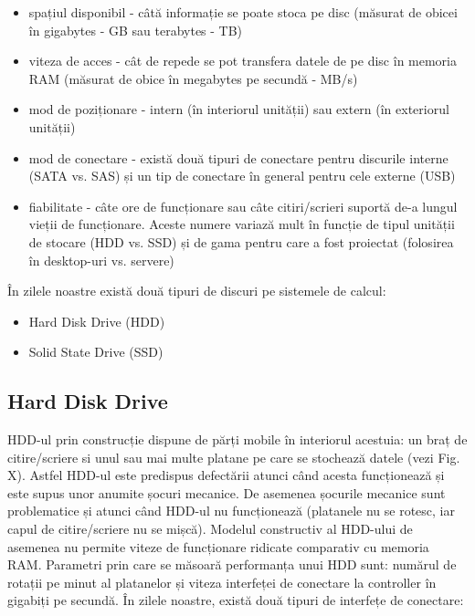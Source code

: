 \begin{itemize}
	\item spațiul disponibil - câtă informație se poate stoca pe disc
		(măsurat de obicei în gigabytes - GB sau terabytes - TB)
	\item viteza de acces - cât de repede se pot transfera datele de pe disc
		în memoria RAM (măsurat de obice în megabytes pe secundă - MB/s)
	\item mod de poziționare - intern (în interiorul unității) sau extern
		(în exteriorul unității)
	\item mod de conectare - există două tipuri de conectare pentru
		discurile interne (SATA vs. SAS) și un tip de conectare în
		general pentru cele externe (USB)
	\item fiabilitate - câte ore de funcționare sau câte citiri/scrieri
		suportă de-a lungul vieții de funcționare. Aceste numere variază
		mult în funcție de tipul unității de stocare (HDD vs. SSD) și de
		gama pentru care a fost proiectat (folosirea în desktop-uri vs.
		servere)
\end{itemize}

În zilele noastre există două tipuri de discuri pe sistemele de calcul:

\begin{itemize}
	\item Hard Disk Drive (HDD)
	\item Solid State Drive (SSD)
\end{itemize}

\subsection{Hard Disk Drive}
\label{sec:storage-tipuri-hdd}

HDD-ul prin construcție dispune de părți mobile în interiorul acestuia: un braț
de citire/scriere si unul sau mai multe platane pe care se stochează datele
(vezi Fig. X). Astfel HDD-ul este predispus defectării atunci când acesta
funcționează și este supus unor anumite șocuri mecanice. De asemenea șocurile
mecanice sunt problematice și atunci când HDD-ul nu funcționează (platanele nu
se rotesc, iar capul de citire/scriere nu se mișcă). Modelul constructiv al
HDD-ului de asemenea nu permite viteze de funcționare ridicate comparativ cu
memoria RAM. Parametri prin care se măsoară performanța unui HDD sunt: numărul
de rotații pe minut al platanelor și viteza interfeței de conectare la
controller în gigabiți pe secundă. În zilele noastre, există două tipuri de
interfețe de conectare:


